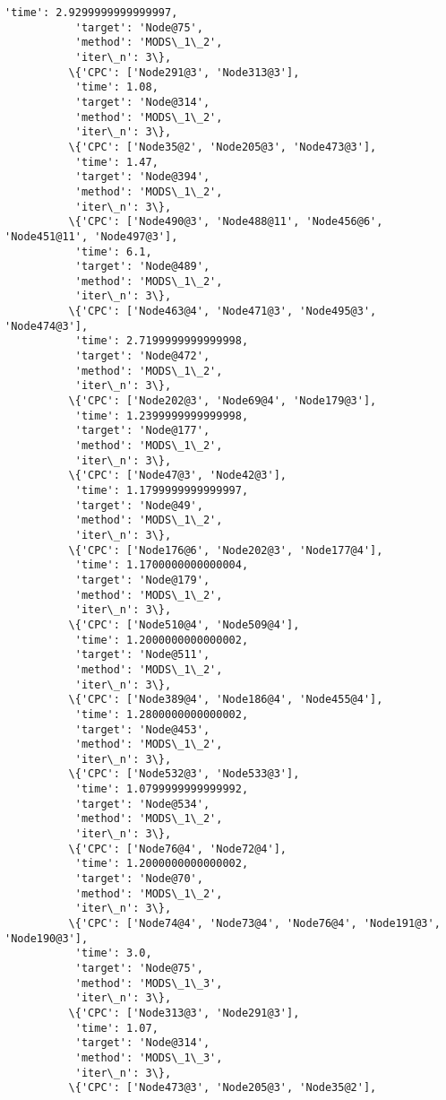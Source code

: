 \documentclass[11pt]{article}
\begin{document}
\begin{Verbatim}[commandchars=\\\{\}]
           'time': 2.9299999999999997,
           'target': 'Node@75',
           'method': 'MODS\_1\_2',
           'iter\_n': 3\},
          \{'CPC': ['Node291@3', 'Node313@3'],
           'time': 1.08,
           'target': 'Node@314',
           'method': 'MODS\_1\_2',
           'iter\_n': 3\},
          \{'CPC': ['Node35@2', 'Node205@3', 'Node473@3'],
           'time': 1.47,
           'target': 'Node@394',
           'method': 'MODS\_1\_2',
           'iter\_n': 3\},
          \{'CPC': ['Node490@3', 'Node488@11', 'Node456@6', 'Node451@11', 'Node497@3'],
           'time': 6.1,
           'target': 'Node@489',
           'method': 'MODS\_1\_2',
           'iter\_n': 3\},
          \{'CPC': ['Node463@4', 'Node471@3', 'Node495@3', 'Node474@3'],
           'time': 2.7199999999999998,
           'target': 'Node@472',
           'method': 'MODS\_1\_2',
           'iter\_n': 3\},
          \{'CPC': ['Node202@3', 'Node69@4', 'Node179@3'],
           'time': 1.2399999999999998,
           'target': 'Node@177',
           'method': 'MODS\_1\_2',
           'iter\_n': 3\},
          \{'CPC': ['Node47@3', 'Node42@3'],
           'time': 1.1799999999999997,
           'target': 'Node@49',
           'method': 'MODS\_1\_2',
           'iter\_n': 3\},
          \{'CPC': ['Node176@6', 'Node202@3', 'Node177@4'],
           'time': 1.1700000000000004,
           'target': 'Node@179',
           'method': 'MODS\_1\_2',
           'iter\_n': 3\},
          \{'CPC': ['Node510@4', 'Node509@4'],
           'time': 1.2000000000000002,
           'target': 'Node@511',
           'method': 'MODS\_1\_2',
           'iter\_n': 3\},
          \{'CPC': ['Node389@4', 'Node186@4', 'Node455@4'],
           'time': 1.2800000000000002,
           'target': 'Node@453',
           'method': 'MODS\_1\_2',
           'iter\_n': 3\},
          \{'CPC': ['Node532@3', 'Node533@3'],
           'time': 1.0799999999999992,
           'target': 'Node@534',
           'method': 'MODS\_1\_2',
           'iter\_n': 3\},
          \{'CPC': ['Node76@4', 'Node72@4'],
           'time': 1.2000000000000002,
           'target': 'Node@70',
           'method': 'MODS\_1\_2',
           'iter\_n': 3\},
          \{'CPC': ['Node74@4', 'Node73@4', 'Node76@4', 'Node191@3', 'Node190@3'],
           'time': 3.0,
           'target': 'Node@75',
           'method': 'MODS\_1\_3',
           'iter\_n': 3\},
          \{'CPC': ['Node313@3', 'Node291@3'],
           'time': 1.07,
           'target': 'Node@314',
           'method': 'MODS\_1\_3',
           'iter\_n': 3\},
          \{'CPC': ['Node473@3', 'Node205@3', 'Node35@2'],

\end{Verbatim}
\end{document}
